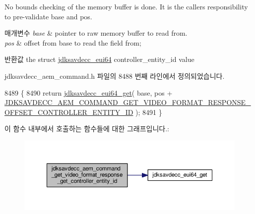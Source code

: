 No bounds checking of the memory buffer is done. It is the caller\textquotesingle{}s responsibility to pre-\/validate base and pos.


\begin{DoxyParams}{매개변수}
{\em base} & pointer to raw memory buffer to read from. \\
\hline
{\em pos} & offset from base to read the field from; \\
\hline
\end{DoxyParams}
\begin{DoxyReturn}{반환값}
the struct \hyperlink{structjdksavdecc__eui64}{jdksavdecc\+\_\+eui64} controller\+\_\+entity\+\_\+id value 
\end{DoxyReturn}


jdksavdecc\+\_\+aem\+\_\+command.\+h 파일의 8488 번째 라인에서 정의되었습니다.


\begin{DoxyCode}
8489 \{
8490     \textcolor{keywordflow}{return} \hyperlink{group__eui64_ga2652311a25a6b91cddbed75c108c7031}{jdksavdecc\_eui64\_get}( base, pos + 
      \hyperlink{group__command__get__video__format__response_ga6c726d9312eee94129dd12f10bc64143}{JDKSAVDECC\_AEM\_COMMAND\_GET\_VIDEO\_FORMAT\_RESPONSE\_OFFSET\_CONTROLLER\_ENTITY\_ID}
       );
8491 \}
\end{DoxyCode}


이 함수 내부에서 호출하는 함수들에 대한 그래프입니다.\+:
\nopagebreak
\begin{figure}[H]
\begin{center}
\leavevmode
\includegraphics[width=350pt]{group__command__get__video__format__response_ga8066ac78bd3abf00142de49d0a369e9e_cgraph}
\end{center}
\end{figure}


